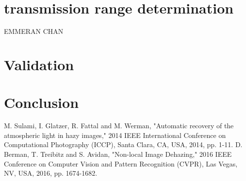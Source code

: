 \documentclass[conference]{IEEEtran}
\begin{document}
\section{transmission range determination}
EMMERAN CHAN

\section{Validation}

\section{Conclusion}


\vspace{12pt}

\begin{thebibliography}{00}
 M. Sulami, I. Glatzer, R. Fattal and M. Werman, "Automatic recovery of the atmospheric light in hazy images," 2014 IEEE International Conference on Computational Photography (ICCP), Santa Clara, CA, USA, 2014, pp. 1-11.
 D. Berman, T. Treibitz and S. Avidan, "Non-local Image Dehazing," 2016 IEEE Conference on Computer Vision and Pattern Recognition (CVPR), Las Vegas, NV, USA, 2016, pp. 1674-1682.
\end{thebibliography}
\end{document}
